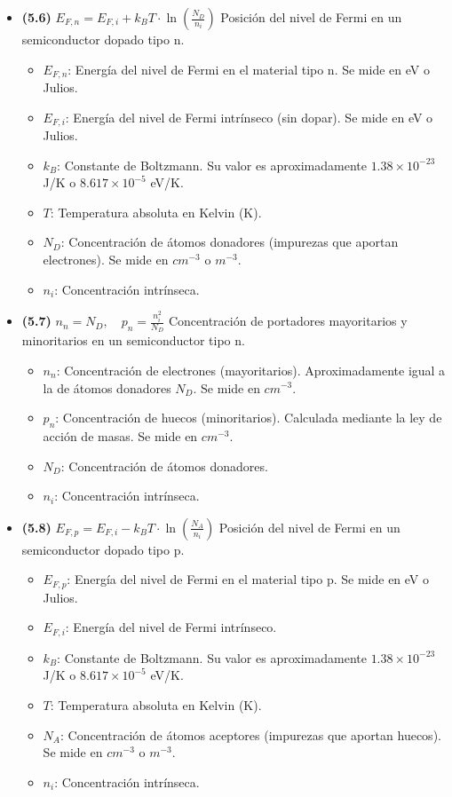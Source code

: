 \documentclass{article}
\begin{document}
\begin{itemize}
				\item \textbf{(5.6)} $\boxed{E_{F,n} = E_{F,i} + k_B T \cdot \ln \left( \frac{N_D}{n_i} \right)}$ Posición del nivel de Fermi en un semiconductor dopado tipo n.
					\begin{itemize}
						\item $E_{F,n}$: Energía del nivel de Fermi en el material tipo n. Se mide en eV o Julios.
						\item $E_{F,i}$: Energía del nivel de Fermi intrínseco (sin dopar). Se mide en eV o Julios.
						\item $k_B$: Constante de Boltzmann. Su valor es aproximadamente $1.38 \times 10^{-23}$ J/K o $8.617 \times 10^{-5}$ eV/K.
						\item $T$: Temperatura absoluta en Kelvin (K).
						\item $N_D$: Concentración de átomos donadores (impurezas que aportan electrones). Se mide en $cm^{-3}$ o $m^{-3}$.
						\item $n_i$: Concentración intrínseca.
					\end{itemize}

				\item \textbf{(5.7)} $\boxed{n_n = N_D, \quad p_n = \frac{n_i^2}{N_D}}$ Concentración de portadores mayoritarios y minoritarios en un semiconductor tipo n.
					\begin{itemize}
						\item $n_n$: Concentración de electrones (mayoritarios). Aproximadamente igual a la de átomos donadores $N_D$. Se mide en $cm^{-3}$.
						\item $p_n$: Concentración de huecos (minoritarios). Calculada mediante la ley de acción de masas. Se mide en $cm^{-3}$.
						\item $N_D$: Concentración de átomos donadores.
						\item $n_i$: Concentración intrínseca.
					\end{itemize}

				\item \textbf{(5.8)} $\boxed{E_{F,p} = E_{F,i} - k_B T \cdot \ln \left( \frac{N_A}{n_i} \right)}$ Posición del nivel de Fermi en un semiconductor dopado tipo p.
					\begin{itemize}
						\item $E_{F,p}$: Energía del nivel de Fermi en el material tipo p. Se mide en eV o Julios.
						\item $E_{F,i}$: Energía del nivel de Fermi intrínseco.
						\item $k_B$: Constante de Boltzmann. Su valor es aproximadamente $1.38 \times 10^{-23}$ J/K o $8.617 \times 10^{-5}$ eV/K.
						\item $T$: Temperatura absoluta en Kelvin (K).
						\item $N_A$: Concentración de átomos aceptores (impurezas que aportan huecos). Se mide en $cm^{-3}$ o $m^{-3}$.
						\item $n_i$: Concentración intrínseca.
					\end{itemize}


\end{itemize}
\end{document}
